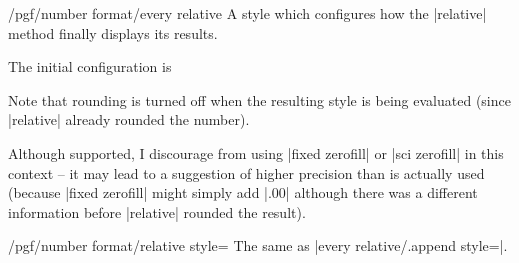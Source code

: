 \begin{stylekey}{/pgf/number format/every relative}
    A style which configures how the |relative| method finally displays its
    results.

    The initial configuration is
\begin{codeexample}
\end{codeexample}

    Note that rounding is turned off when the resulting style is being
    evaluated (since |relative| already rounded the number).

    Although supported, I discourage from using |fixed zerofill| or
    |sci zerofill| in this context -- it may lead to a suggestion of higher
    precision than is actually used (because |fixed zerofill| might simply add
    |.00| although there was a different information before |relative| rounded
    the result).
\end{stylekey}

\begin{key}{/pgf/number format/relative style=}
    The same as |every relative/.append style=|.
\end{key}

